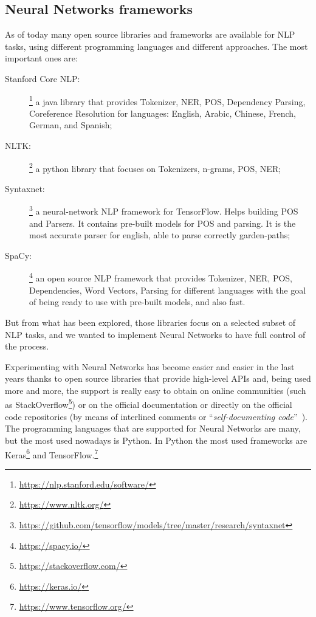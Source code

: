 \subsection{Neural Networks frameworks}
\label{implementationNN}

As of today many open source libraries and frameworks are available for NLP tasks, using different programming languages and different approaches. The most important ones are:

\begin{description}
	\item[Stanford Core NLP:]\footnote{\url{https://nlp.stanford.edu/software/}} a java library that provides Tokenizer, NER, POS, Dependency Parsing, Coreference Resolution for languages: English, Arabic, Chinese, French, German, and Spanish;
	\item[NLTK:]\footnote{\url{https://www.nltk.org/}} a python library that focuses on Tokenizers, n-grams, POS, NER;
	\item[Syntaxnet:]\footnote{\url{https://github.com/tensorflow/models/tree/master/research/syntaxnet}} a neural-network NLP framework for TensorFlow. Helps building POS and Parsers. It contains pre-built models for POS and parsing. It is the most accurate parser for english, able to parse correctly garden-paths;
	\item[SpaCy:]\footnote{\url{https://spacy.io/}} an open source NLP framework that provides Tokenizer, NER, POS, Dependencies, Word Vectors, Parsing for different languages with the goal of being ready to use with pre-built models, and also fast.
\end{description}
But from what has been explored, those libraries focus on a selected subset of NLP tasks, and we wanted to implement Neural Networks to have full control of the process.

Experimenting with Neural Networks has become easier and easier in the last years thanks to open source libraries that provide high-level APIs and, being used more and more, the support is really easy to obtain on online communities (such as StackOverflow\footnote{\url{https://stackoverflow.com/}}) or on the official documentation or directly on the official code repositories (by means of interlined comments or ``\textit{self-documenting code}''~\cite{raskin2005comments}). The programming languages that are supported for Neural Networks are many, but the most used nowadays is Python. In Python the most used frameworks are Keras\footnote{\url{https://keras.io/}} and TensorFlow.\footnote{\url{https://www.tensorflow.org/}}

